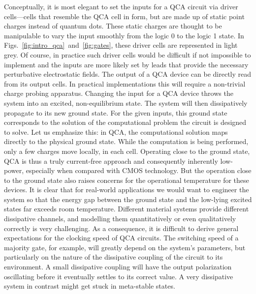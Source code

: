 Conceptually, it is most elegant to set the inputs for a QCA circuit via driver
cells---cells that resemble the QCA cell in form, but are made up of static
point charges instead of quantum dots. These static charges are thought to be
manipulable to vary the input smoothly from the logic 0 to the logic 1 state.
In Figs.~\ref{fig:intro_qca}~and~\ref{fig:gates}, these driver cells are
represented in light grey. Of course, in practice such driver cells would be
difficult if not impossible to implement and the inputs are more likely set by
leads that provide the necessary perturbative electrostatic fields. The output
of a QCA device can be directly read from its output cells. In practical
implementations this will require a non-trivial charge probing apparatus.
Changing the input for a QCA device throws the system into an excited,
non-equilibrium state. The system will then dissipatively propagate to its new
ground state. For the given inputs, this ground state corresponds to the
solution of the computational problem the circuit is designed to solve. Let us
emphasize this: in QCA, the computational solution maps directly to the physical
ground state. While the computation is being performed, only a few charges move locally,
in each cell. Operating close to the ground state, QCA is thus a truly
current-free approach and consequently inherently low-power, especially when
compared with CMOS technology. But the operation close to the ground state also
raises concerns for the operational temperature for these devices. It is clear
that for real-world applications we would want to engineer the system so that
the energy gap between the ground state and the low-lying excited states far
exceeds room temperature. Different material systems provide different
dissipative channels, and modelling them quantitatively or even qualitatively
correctly is very challenging. As a consequence, it is difficult to derive
general expectations for the clocking speed of QCA circuits. The switching speed
of a majority gate, for example, will greatly depend on the system's parameters,
but particularly on the nature of the dissipative coupling of the circuit to its
environment. A small dissipative coupling will have the output polarization
oscillating before it eventually settles to its correct value. A very
dissipative system in contrast might get stuck in meta-stable states. 

